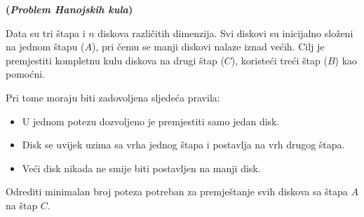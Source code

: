 \begin{example}
	\textbf{(\emph{Problem Hanojskih kula})}
	
	Data su tri štapa i $n$ diskova različitih dimenzija. Svi diskovi su inicijalno složeni na jednom štapu ($A$), pri čemu se manji diskovi nalaze iznad većih. Cilj je premjestiti kompletnu kulu diskova na drugi štap ($C$), koristeći treći štap ($B$) kao pomoćni.
	
	Pri tome moraju biti zadovoljena sljedeća pravila:
	
	\begin{itemize}
		\item U jednom potezu dozvoljeno je premjestiti samo jedan disk.
		
		\item Disk se uvijek uzima sa vrha jednog štapa i postavlja na vrh drugog štapa.
		
		\item Veći disk nikada ne smije biti postavljen na manji disk.
		
	\end{itemize}
	
	Odrediti minimalan broj poteza potreban za premještanje svih diskova sa štapa $A$ na štap $C$.
\end{example}

